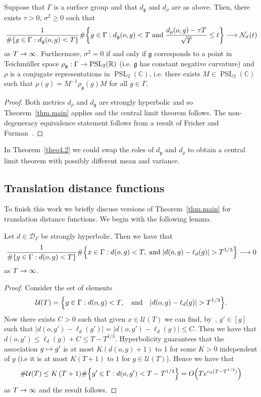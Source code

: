 \documentclass[AHL,Unicode,longabstracts,published]{cedram}
\newcommand{\G}{\Gamma}
\newcommand{\fkg}{\mathfrak{g}}
\newcommand{\Dc}{\mathcal{D}}
\newcommand{\Uc}{\mathcal{U}}
\newcommand{\Nc}{\mathcal{N}}
\newcommand{\C}{\mathbb{C}}
\newcommand{\R}{\mathbb{R}}
\DeclareMathOperator{\PSL}{PSL}
\let\originalleft\left
\let\originalright\right
\renewcommand{\left}{\mathopen{}\mathclose\bgroup\originalleft}
\renewcommand{\right}{\aftergroup\egroup\originalright}
\renewcommand*{\to}{\mathchoice{\longrightarrow}{\rightarrow}{\rightarrow}{\rightarrow}}
\let\oldmapsto\mapsto
\renewcommand*{\mapsto}{\mathchoice{\longmapsto}{\oldmapsto}{\oldmapsto}{\oldmapsto}}
\theoremstyle{plain}
\newcommand{\G}{\Gamma}
\begin{document}
\begin{theo}\label{theo4.2}
Suppose that $\G$ is a surface group and that $d_\fkg$ and $d_\rho$ are as above. Then, there exists $\tau > 0$, $\sigma^2 \ge 0$ such that
\begin{align*}
\frac{1}{\#\{ g\in\G : d_\fkg(o,g) < T\}}
 \#\left\{ g\in\G : d_\fkg(o,g) < T \; \text{and} \; \frac{d_{\rho}(o,g) - \tau T}{\sqrt{T}} \le t \right\} \to \Nc_\sigma(t)
\end{align*}
as $T\to\infty$. Furthermore, $\sigma^2 = 0$ if and only if $\fkg$ corresponds to a point in Teichm\"uller space $\rho_\fkg : \G \to \PSL_2(\R)$ (i.e. $\fkg$ has constant negative curvature) and $\rho$ is a conjugate representations in $\PSL_2(\C)$, i.e. there exists $M \in \PSL_2(\C)$ such that $\rho(g) = M^{-1}\rho_\fkg(g) M$ for all $g \in \G$.
\end{theo}

\begin{proof}
Both metrics $d_\rho$ and $d_\fkg$ are strongly hyperbolic and so Theorem~\ref{thm.main} applies and the central limit theorem follows. The non-degeneracy equivalence statement follows from a result of Fricker and Furman~\cite[Theorem~A]{fricker.furman}.
\end{proof}

In Theorem~\ref{theo4.2} we could swap the roles of $d_\fkg$ and $d_\rho$ to obtain a central limit theorem with possibly different mean and variance.

\subsection{Translation distance functions}

To finish this work we briefly discuss versions of Theorem~\ref{thm.main} for translation distance functions. We begin with the following lemma.

\begin{lemm}
Let $d \in \Dc_\G$ be strongly hyperbolic. Then we have that
\begin{align*}
\frac{1}{\#\{g \in \G: d(o,g) < T\}}
 \#\left\{x\in\G: d(o,g) < T, \;\text{and}\;
|d(o,g) - \ell_d(g)| > T^{1/3} \right\} \to 0
\end{align*}
as $T\to\infty$.
\end{lemm}
\begin{proof}
Consider the set of elements
\[
\Uc(T) = \left\{g\in\G: d(o,g) < T,  \quad\text{and}\quad |d(o,g) - \ell_d(g)| > T^{1/3} \right\}.
\]
Now there exists $C>0$ such that given $x \in \Uc(T)$ we can find, by~\cite[Lemma~3.2]{cantrell.tanaka.1}, $g' \in [g]$ such that $|d(o,g') - \ell_d(g')| = |d(o,g') - \ell_d(g)| \le C$. Then we have that $d(o,g') \le \ell_d(g) + C \le T - T^{1/3}$. Hyperbolicity guarantees that the association $g \mapsto g'$ is at most $K (d(o,g) + 1) $ to $1$ for some $K > 0$ independent of $g$ (i.e it is at most $K(T+1)$ to $1$ for $g\in \Uc(T)$). Hence we have that
\[
\#\Uc(T) \le K \, (T+1)\#\left\{g' \in \G: d(o,g') < T- T^{1/3} \right\} = O\left(T e^{v_d(T-T^{1/3})}\right)
\]
as $T\to\infty$ and the result follows.
\end{proof}
\end{document}
